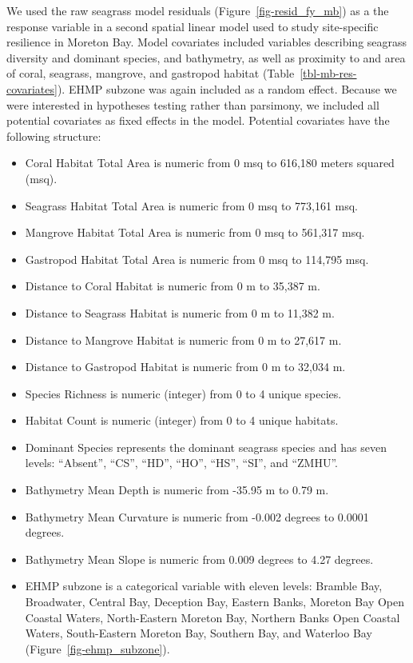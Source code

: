 \documentclass[
  letterpaper,
  DIV=11,
  numbers=noendperiod]{scrartcl}
\providecommand{\tightlist}{%
  \setlength{\itemsep}{0pt}\setlength{\parskip}{0pt}}
\begin{document}
We used the raw seagrass model residuals (Figure~\ref{fig-resid_fy_mb})
as a the response variable in a second spatial linear model used to
study site-specific resilience in Moreton Bay. Model covariates included
variables describing seagrass diversity and dominant species, and
bathymetry, as well as proximity to and area of coral, seagrass,
mangrove, and gastropod habitat (Table~\ref{tbl-mb-res-covariates}).
EHMP subzone was again included as a random effect. Because we were
interested in hypotheses testing rather than parsimony, we included all
potential covariates as fixed effects in the model. Potential covariates
have the following structure:

\begin{itemize}
\tightlist
\item
  Coral Habitat Total Area is numeric from 0 msq to 616,180 meters
  squared (msq).
\item
  Seagrass Habitat Total Area is numeric from 0 msq to 773,161 msq.
\item
  Mangrove Habitat Total Area is numeric from 0 msq to 561,317 msq.
\item
  Gastropod Habitat Total Area is numeric from 0 msq to 114,795 msq.
\item
  Distance to Coral Habitat is numeric from 0 m to 35,387 m.
\item
  Distance to Seagrass Habitat is numeric from 0 m to 11,382 m.
\item
  Distance to Mangrove Habitat is numeric from 0 m to 27,617 m.
\item
  Distance to Gastropod Habitat is numeric from 0 m to 32,034 m.
\item
  Species Richness is numeric (integer) from 0 to 4 unique species.
\item
  Habitat Count is numeric (integer) from 0 to 4 unique habitats.
\item
  Dominant Species represents the dominant seagrass species and has
  seven levels: ``Absent'', ``CS'', ``HD'', ``HO'', ``HS'', ``SI'', and
  ``ZMHU''.
\item
  Bathymetry Mean Depth is numeric from -35.95 m to 0.79 m.
\item
  Bathymetry Mean Curvature is numeric from -0.002 degrees to 0.0001
  degrees.
\item
  Bathymetry Mean Slope is numeric from 0.009 degrees to 4.27 degrees.
\item
  EHMP subzone is a categorical variable with eleven levels: Bramble
  Bay, Broadwater, Central Bay, Deception Bay, Eastern Banks, Moreton
  Bay Open Coastal Waters, North-Eastern Moreton Bay, Northern Banks
  Open Coastal Waters, South-Eastern Moreton Bay, Southern Bay, and
  Waterloo Bay (Figure~\ref{fig-ehmp_subzone}).
\end{itemize}
\end{document}
